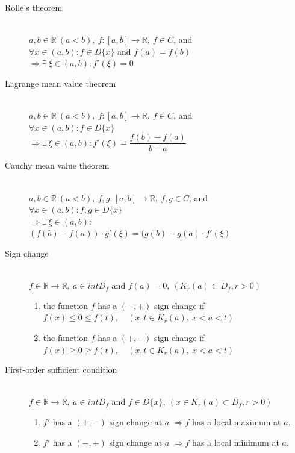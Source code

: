 \documentclass[margin=0px]{article}
\newcommand{\R}{\mathbb{R}}
\begin{document}
\begin{description}
    \item[Rolle's theorem] \hfill \\
        $ a,b \in \R \ (a<b), \ f:[a,b] \rightarrow \R, \ f\in C$, and \\
        $ \forall x\in (a,b) : f\in D\{x\} $ and $ f(a) = f(b) $ \\
        $ \Rightarrow \exists \ \xi \in (a,b) : f'(\xi) = 0 $
    \item[Lagrange mean value theorem] \hfill \\
        $ a,b \in \R \ (a<b), \ f:[a,b] \rightarrow \R, \ f\in C$, and \\
        $ \forall x\in (a,b) : f\in D\{x\} $ \\
        $ \Rightarrow \exists \ \xi \in (a,b) : f'(\xi) = \dfrac{f(b)-f(a)}{b-a}  $
    \item[Cauchy mean value theorem] \hfill \\
        $ a,b \in \R \ (a<b), \ f,g:[a,b] \rightarrow \R, \ f,g\in C$, and \\
        $ \forall x\in (a,b) : f,g\in D\{x\} $ \\
        $ \Rightarrow \exists \ \xi \in (a,b) :$ \\
        $ (f(b)-f(a))\cdot g'(\xi) = (g(b)-g(a)\cdot f'(\xi) $
\end{description}
\begin{description}
    \item[Sign change] \hfill \\
        $ f \in \R \rightarrow \R,\ a \in intD_f $ and $ f(a) = 0, \ ( K_r(a) \subset D_f, r > 0 ) $
        \begin{enumerate}
            \item the function $f$ has a $ (-,+) $ sign change if \\
                  $ f(x) \leq 0 \leq f(t), \quad (x,t \in K_r(a), \ x<a<t) $
            \item the function $f$ has a $ (+,-) $ sign change if \\
                  $ f(x) \geq 0 \geq f(t), \quad (x,t \in K_r(a), \ x<a<t) $
        \end{enumerate}
    \item[First-order sufficient condition] \hfill \\
        $ f \in \R \rightarrow \R, \ a \in intD_f $ and $ f\in D\{x\}, \ (x \in K_r(a) \subset D_f, r > 0 ) $
        \begin{enumerate}
            \item $f'$ has a $(+,-)$ sign change at $a$ $\Rightarrow f$ has a local maximum at $a$.
            \item $f'$ has a $(-,+)$ sign change at $a$ $\Rightarrow f$ has a local minimum at $a$.
        \end{enumerate}
\end{description}
\end{document}
